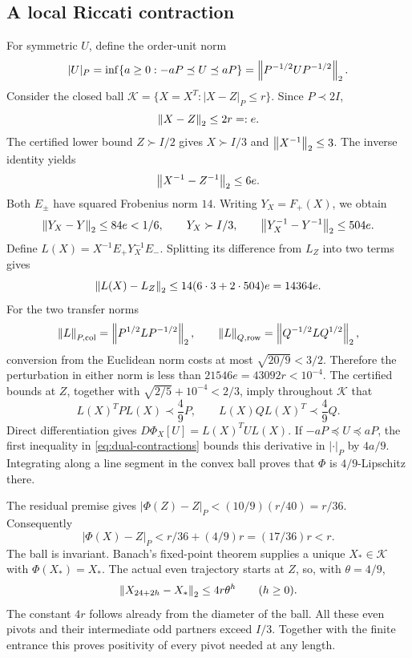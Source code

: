 \subsection{A local Riccati contraction}

For symmetric $U$, define the order-unit norm
\[
 |U|_P=\inf\{a\ge0:-aP\preceq U\preceq aP\}
      =\left\lVert P^{-1/2}UP^{-1/2}\right\rVert_2.
\]
Consider the closed ball
$\mathcal K=\{X=X^T:|X-Z|_P\le r\}$. Since $P\prec2I$,
\[
 \left\lVert X-Z\right\rVert_2\le2r=:e.
\]
The certified lower bound $Z\succ I/2$ gives $X\succ I/3$ and
$\left\lVert X^{-1}\right\rVert_2\le3$. The inverse identity yields
\[
 \left\lVert X^{-1}-Z^{-1}\right\rVert_2\le6e.
\]
Both $E_\pm$ have squared Frobenius norm $14$. Writing $Y_X=F_+(X)$,
we obtain
\[
 \left\lVert Y_X-Y\right\rVert_2\le84e<1/6,
 \qquad Y_X\succ I/3,
 \qquad \left\lVert Y_X^{-1}-Y^{-1}\right\rVert_2\le504e.
\]
Define $L(X)=X^{-1}E_+Y_X^{-1}E_-$. Splitting its difference from
$L_Z$ into two terms gives
\begin{equation}
 \left\lVert L(X)-L_Z\right\rVert_2
 \le14(6\cdot3+2\cdot504)e=14364e.
 \label{eq:Lperturb}
\end{equation}
For the two transfer norms
\[
 \left\lVert L\right\rVert_{P,\mathrm{col}}=\left\lVert P^{1/2}LP^{-1/2}\right\rVert_2,
 \qquad
 \left\lVert L\right\rVert_{Q,\mathrm{row}}=\left\lVert Q^{-1/2}LQ^{1/2}\right\rVert_2,
\]
conversion from the Euclidean norm costs at most
$\sqrt{20/9}<3/2$. Therefore the perturbation in either norm is less
than $21546e=43092r<10^{-4}$. The certified bounds at $Z$, together with
$\sqrt{2/5}+10^{-4}<2/3$, imply throughout $\mathcal K$ that
\begin{equation}
 L(X)^TPL(X)\prec\frac49P,
 \qquad L(X)QL(X)^T\prec\frac49Q.
 \label{eq:dual-contractions}
\end{equation}
Direct differentiation gives
$D\Phi_X[U]=L(X)^TUL(X)$. If $-aP\preceq U\preceq aP$, the first
inequality in \eqref{eq:dual-contractions} bounds this derivative in
$|\cdot|_P$ by $4a/9$. Integrating along a line segment in the convex
ball proves that $\Phi$ is $4/9$-Lipschitz there.

The residual premise gives
$|\Phi(Z)-Z|_P<(10/9)(r/40)=r/36$. Consequently
\[
 |\Phi(X)-Z|_P<r/36+(4/9)r=(17/36)r<r.
\]
The ball is invariant. Banach's fixed-point theorem supplies a unique
$X_*\in\mathcal K$ with $\Phi(X_*)=X_*$. The actual even trajectory
starts at $Z$, so, with $\theta=4/9$,
\begin{equation}
 \left\lVert X_{24+2h}-X_*\right\rVert_2\le4r\theta^h
 \qquad(h\ge0).
 \label{eq:pivot-decay}
\end{equation}
The constant $4r$ follows already from the diameter of the ball. All these
even pivots and their intermediate odd partners exceed $I/3$. Together
with the finite entrance this proves positivity of every pivot needed
at any length.

